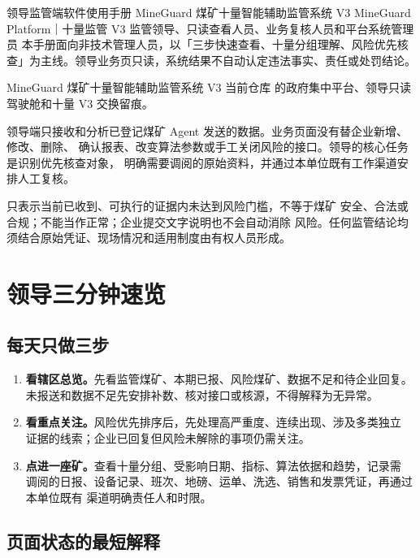 \documentclass[UTF8,openany,zihao=-4,fontset=none]{ctexbook}
\begin{document}
\MakeManualCover
  {领导监管端软件使用手册}
  {MineGuard 煤矿十量智能辅助监管系统 V3}
  {MineGuard Platform｜十量监管 V3}
  {监管领导、只读查看人员、业务复核人员和平台系统管理员}
  {本手册面向非技术管理人员，以「三步快速查看、十量分组理解、风险优先核查」为主线。领导业务页只读，系统结果不自动认定违法事实、责任或处罚结论。}

\DocumentControl
  {MineGuard 煤矿十量智能辅助监管系统 V3}
  {当前仓库  的政府集中平台、领导只读驾驶舱和十量 V3 交换留痕。}

\begin{importantbox}
领导端只接收和分析已登记煤矿 Agent 发送的数据。业务页面没有替企业新增、修改、删除、
确认报表、改变算法参数或手工关闭风险的接口。领导的核心任务是识别优先核查对象，
明确需要调阅的原始资料，并通过本单位既有工作渠道安排人工复核。
\end{importantbox}

\begin{warningbox}
只表示当前已收到、可执行的证据内未达到风险门槛，不等于煤矿
安全、合法或合规；不能当作正常；企业提交文字说明也不会自动消除
风险。任何监管结论均须结合原始凭证、现场情况和适用制度由有权人员形成。
\end{warningbox}

\chapter*{领导三分钟速览}

\section*{每天只做三步}

\begin{enumerate}
  \item \textbf{看辖区总览。}先看监管煤矿、本期已报、风险煤矿、数据不足和待企业回复。
  未报送和数据不足先安排补数、核对接口或核源，不得解释为无异常。
  \item \textbf{看重点关注。}风险优先排序后，先处理高严重度、连续出现、涉及多类独立
  证据的线索；企业已回复但风险未解除的事项仍需关注。
  \item \textbf{点进一座矿。}查看十量分组、受影响日期、指标、算法依据和趋势，记录需
  调阅的日报、设备记录、班次、地磅、运单、洗选、销售和发票凭证，再通过本单位既有
  渠道明确责任人和时限。
\end{enumerate}

\section*{页面状态的最短解释}
\end{document}
